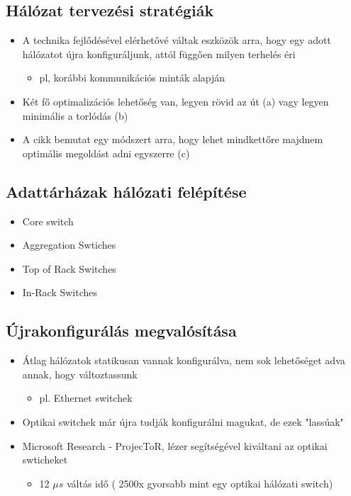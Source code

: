 \documentclass[12pt]{report}
\begin{document}
\subsection{Hálózat tervezési stratégiák}

\begin{itemize}
	\item A technika fejlődésével elérhetővé váltak eszközök arra, hogy egy adott hálózatot újra konfiguráljunk, attól függően milyen terhelés éri
	\begin{itemize}
		\item pl, korábbi kommunikációs minták alapján
	\end{itemize}
	\item Két fő optimalizációs lehetőség van, legyen rövid az út (a) vagy legyen minimális a torlódás (b)
	\item A cikk bemutat egy módszert arra, hogy lehet mindkettőre majdnem optimális megoldást adni egyszerre (c)
\end{itemize}


\subsection{Adattárházak hálózati felépítése}

\begin{itemize}
	\item Core switch
	\item Aggregation Swtiches
	\item Top of Rack Switches
	\item In-Rack Switches
\end{itemize}

\subsection{Újrakonfigurálás megvalósítása}

\begin{itemize}
	\item Átlag hálózatok statikusan vannak konfigurálva, nem  sok lehetőséget adva annak, hogy változtassunk 
	\begin{itemize}
		\item pl. Ethernet switchek
	\end{itemize}
	\item Optikai switchek már újra tudják konfigurálni magukat, de ezek "lassúak"
	\item Microsoft Research - ProjecToR\cite{ghobadi_projector:_2016}, lézer segítségével kiváltani az optikai swticheket
	\begin{itemize}
		\item 12 $\mu s$ váltás idő ( 2500x gyorsabb mint egy optikai hálózati switch)
	\end{itemize}
	
\end{itemize}
\end{document}
